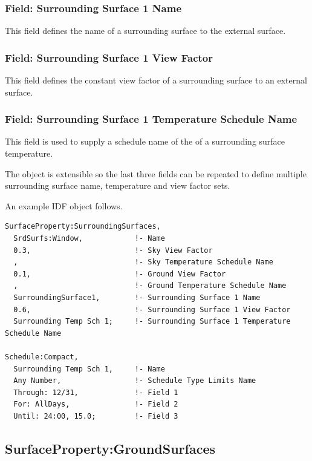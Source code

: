 \subsubsection{Field: Surrounding Surface 1 Name}\label{field-surrounding-surface-1-name}

This field defines the name of a surrounding surface to the external surface.

\subsubsection{Field: Surrounding Surface 1 View Factor}\label{field-surrounding-surface-1-view-factor}

This field defines the constant view factor of a surrounding surface to an external surface.

\subsubsection{Field: Surrounding Surface 1 Temperature Schedule Name}\label{field-surrounding-surface-1-temp-schedule-name}

This field is used to supply a schedule name of the of a surrounding surface temperature.

The object is extensible so the last three fields can be repeated to define multiple surrounding surface name, temperature and view factor sets.

An example IDF object follows.

\begin{lstlisting}
SurfaceProperty:SurroundingSurfaces,
  SrdSurfs:Window,            !- Name
  0.3,                        !- Sky View Factor
  ,                           !- Sky Temperature Schedule Name
  0.1,                        !- Ground View Factor
  ,                           !- Ground Temperature Schedule Name
  SurroundingSurface1,        !- Surrounding Surface 1 Name
  0.6,                        !- Surrounding Surface 1 View Factor
  Surrounding Temp Sch 1;     !- Surrounding Surface 1 Temperature Schedule Name

Schedule:Compact,
  Surrounding Temp Sch 1,     !- Name
  Any Number,                 !- Schedule Type Limits Name
  Through: 12/31,             !- Field 1
  For: AllDays,               !- Field 2
  Until: 24:00, 15.0;         !- Field 3
\end{lstlisting}

\subsection{SurfaceProperty:GroundSurfaces}\label{surfacePropertyGroundSurfaces}

